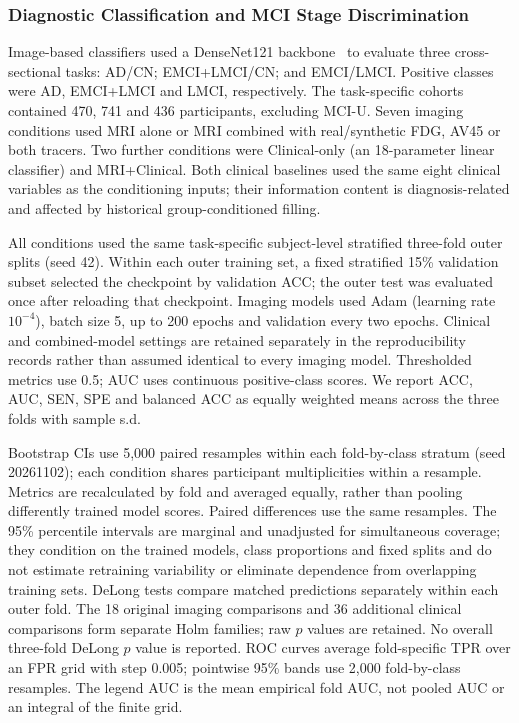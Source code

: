 \documentclass{article}
\begin{document}
\subsubsection{Diagnostic Classification and MCI Stage Discrimination}
Image-based classifiers used a DenseNet121 backbone~\cite{huang2017densely} to evaluate three cross-sectional tasks: AD/CN; EMCI+LMCI/CN; and EMCI/LMCI. Positive classes were AD, EMCI+LMCI and LMCI, respectively. The task-specific cohorts contained 470, 741 and 436 participants, excluding MCI-U. Seven imaging conditions used MRI alone or MRI combined with real/synthetic FDG, AV45 or both tracers. Two further conditions were Clinical-only (an 18-parameter linear classifier) and MRI+Clinical. Both clinical baselines used the same eight clinical variables as the conditioning inputs; their information content is diagnosis-related and affected by historical group-conditioned filling.

All conditions used the same task-specific subject-level stratified three-fold outer splits (seed 42). Within each outer training set, a fixed stratified 15\% validation subset selected the checkpoint by validation ACC; the outer test was evaluated once after reloading that checkpoint. Imaging models used Adam (learning rate $10^{-4}$), batch size 5, up to 200 epochs and validation every two epochs. Clinical and combined-model settings are retained separately in the reproducibility records rather than assumed identical to every imaging model. Thresholded metrics use 0.5; AUC uses continuous positive-class scores. We report ACC, AUC, SEN, SPE and balanced ACC as equally weighted means across the three folds with sample s.d.

Bootstrap CIs use 5,000 paired resamples within each fold-by-class stratum (seed 20261102); each condition shares participant multiplicities within a resample. Metrics are recalculated by fold and averaged equally, rather than pooling differently trained model scores. Paired differences use the same resamples. The 95\% percentile intervals are marginal and unadjusted for simultaneous coverage; they condition on the trained models, class proportions and fixed splits and do not estimate retraining variability or eliminate dependence from overlapping training sets. DeLong tests compare matched predictions separately within each outer fold. The 18 original imaging comparisons and 36 additional clinical comparisons form separate Holm families; raw $p$ values are retained. No overall three-fold DeLong $p$ value is reported. ROC curves average fold-specific TPR over an FPR grid with step 0.005; pointwise 95\% bands use 2,000 fold-by-class resamples. The legend AUC is the mean empirical fold AUC, not pooled AUC or an integral of the finite grid.
\end{document}
